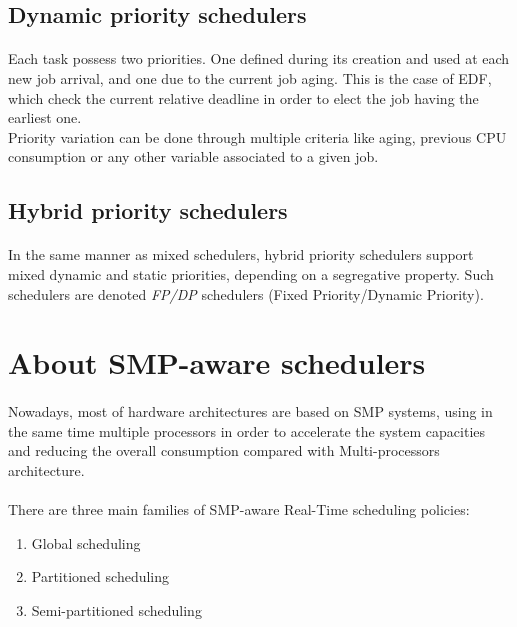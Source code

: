 \subsection{Dynamic priority schedulers}

\paragraph{}
Each task possess two priorities. One defined during its creation and used at each new job arrival,
and one due to the current job aging. This is the case of EDF, which check the current relative
deadline in order to elect the job having the earliest one.\\
Priority variation can be done through multiple criteria like aging, previous CPU consumption or
any other variable associated to a given job.

\subsection{Hybrid priority schedulers}

\paragraph{}
In the same manner as mixed schedulers, hybrid priority schedulers support mixed dynamic and static
priorities, depending on a segregative property. Such schedulers are denoted {\it FP/DP} schedulers
(Fixed Priority/Dynamic Priority).

\section{About SMP-aware schedulers}

\paragraph{}
Nowadays, most of hardware architectures are based on SMP systems, using in the same time multiple
processors in order to accelerate the system capacities and reducing the overall consumption
compared with Multi-processors architecture.

\paragraph{}
There are three main families of SMP-aware Real-Time scheduling policies:\\
\begin{enumerate}
\item {}Global scheduling
\item {}Partitioned scheduling
\item {}Semi-partitioned scheduling
\end{enumerate}

